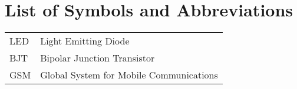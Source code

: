\chapter*{List of Symbols and Abbreviations}

\begin{center}
\begin{tabular}{ l l}

LED & Light Emitting Diode \\ 
BJT & Bipolar Junction Transistor \\
GSM & Global System for Mobile Communications \\
 





\end{tabular}
\end{center}